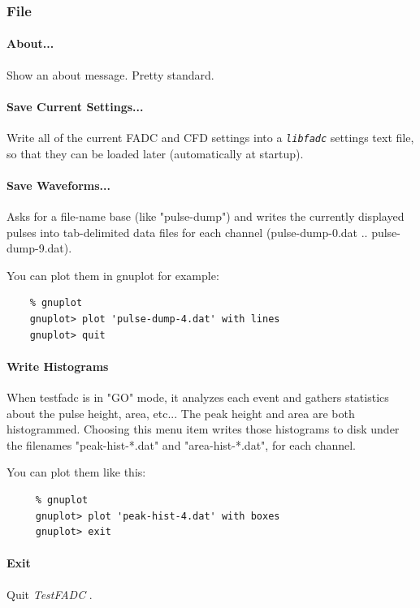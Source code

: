 \documentclass{article}
\newcommand{\libfadc}{\emph{\texttt{libfadc}} }
\newcommand{\testfadc}{\emph{TestFADC} }
\begin{document}
\subsubsection{File}
\paragraph{About...}
Show an about message. Pretty standard.


\paragraph{Save Current Settings...}
\label{savesettings}
Write all of the current FADC and CFD settings into a \libfadc
settings text file, so that they can be loaded later (automatically at
startup).

\paragraph{Save Waveforms...}
Asks for a file-name base (like "pulse-dump") and writes the currently
displayed pulses into tab-delimited data files for each channel
(pulse-dump-0.dat .. pulse-dump-9.dat). 

You can plot them in gnuplot for example:

\begin{verbatim}
    % gnuplot
    gnuplot> plot 'pulse-dump-4.dat' with lines
    gnuplot> quit
\end{verbatim}


\paragraph{Write Histograms}
\label{writehist}
 When testfadc is in "GO" mode, it analyzes each event and gathers
 statistics about the pulse height, area, etc... The peak height
 and area are both histogrammed.  Choosing this menu item writes
 those histograms to disk under the filenames "peak-hist-*.dat"
 and "area-hist-*.dat", for each channel.  
 
 You can plot them like this:
 \begin{verbatim}    
     % gnuplot
     gnuplot> plot 'peak-hist-4.dat' with boxes
     gnuplot> exit
 \end{verbatim}

\paragraph{Exit}
Quit \testfadc.
\end{document}
